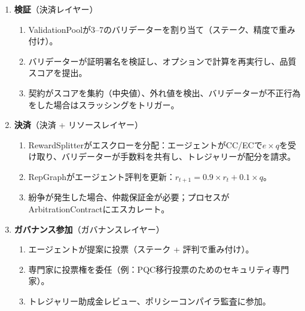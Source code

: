 \documentclass[11pt]{article}
\begin{document}
\begin{enumerate}
  \item \textbf{検証}（決済レイヤー）
    \begin{enumerate}[label=\alph*.]
      \item ValidationPoolが3--7のバリデーターを割り当て（ステーク、精度で重み付け）。
      \item バリデーターが証明署名を検証し、オプションで計算を再実行し、品質スコアを提出。
      \item 契約がスコアを集約（中央値）、外れ値を検出、バリデーターが不正行為をした場合はスラッシングをトリガー。
    \end{enumerate}
  \item \textbf{決済}（決済 + リソースレイヤー）
    \begin{enumerate}[label=\alph*.]
      \item RewardSplitterがエスクローを分配：エージェントがCC/ECで$e \times q$を受け取り、バリデーターが手数料を共有し、トレジャリーが配分を請求。
      \item RepGraphがエージェント評判を更新：$r_{t+1} = 0.9 \times r_t + 0.1 \times q$。
      \item 紛争が発生した場合、仲裁保証金が必要；プロセスがArbitrationContractにエスカレート。
    \end{enumerate}
  \item \textbf{ガバナンス参加}（ガバナンスレイヤー）
    \begin{enumerate}[label=\alph*.]
      \item エージェントが提案に投票（ステーク + 評判で重み付け）。
      \item 専門家に投票権を委任（例：PQC移行投票のためのセキュリティ専門家）。
      \item トレジャリー助成金レビュー、ポリシーコンパイラ監査に参加。
    \end{enumerate}
\end{enumerate}
\end{document}
